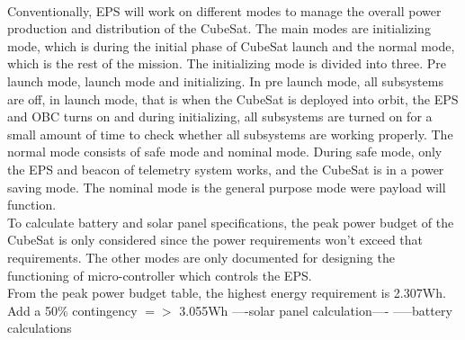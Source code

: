 \\
 Conventionally, EPS will work on different modes to manage the overall power production and distribution of the CubeSat. The main modes are initializing mode, which is during the initial phase of CubeSat launch and the normal mode, which is the rest of the mission. The initializing mode is divided into three. Pre launch mode, launch mode and initializing. In pre launch mode, all subsystems are off, in launch mode, that is when the CubeSat is deployed into orbit, the EPS and OBC turns on and during initializing, all subsystems are turned on for a small amount of time to check whether all subsystems are working properly. The normal mode consists of safe mode and nominal mode. During safe mode, only the EPS and beacon of telemetry system works, and the CubeSat is in a power saving mode. The nominal mode is the general purpose mode were payload will function.
 \\
 To calculate battery and solar panel specifications, the peak power budget of the CubeSat is only considered since the power requirements won’t exceed that requirements. The other modes are only documented for designing the functioning of micro-controller which controls the EPS.
 \\
 From the peak power budget table, the highest energy requirement is 2.307Wh.
 \\
 Add a 50\% contingency $=>$ 3.055Wh
 ----solar panel calculation----
 -----battery calculations